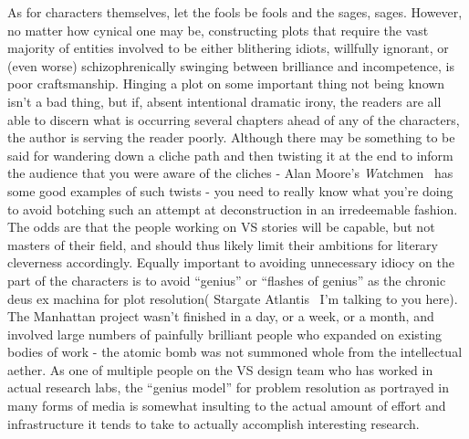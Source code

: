 As for characters themselves, let the fools be fools and the sages,
sages. However, no matter how cynical one may be, constructing plots
that require the vast majority of entities involved to be either
blithering idiots, willfully ignorant, or (even worse)
schizophrenically swinging between brilliance and incompetence, is
poor craftsmanship. Hinging a plot on some important thing not being
known isn't a bad thing, but if, absent intentional dramatic irony,
the readers are all able to discern what is occurring several chapters
ahead of any of the characters, the author is serving the reader
poorly. Although there may be something to be said for wandering down
a cliche path and then twisting it at the end to inform the audience
that you were aware of the cliches - Alan Moore's {\emph
Watchmen}~\cite{Moore-Watchmen} has some good examples of such twists - 
you need to really know what you're doing to avoid botching such an
attempt at deconstruction in an irredeemable fashion. The odds are that
the people working on VS stories will be capable, but not masters of
their field, and should thus likely limit their ambitions for literary
cleverness accordingly. Equally important to avoiding unnecessary
idiocy on the part of the characters is to avoid ``genius'' or
``flashes of genius'' as the chronic deus ex machina for plot
resolution( Stargate Atlantis~\cite{StargateAtlantis} I'm talking to
you here). The Manhattan project wasn't finished in a day, or a week,
or a month, and involved large numbers of painfully brilliant people
who expanded on existing bodies of work - the atomic bomb was not
summoned whole from the intellectual aether. As one of multiple people
on the VS design team who has worked in actual research labs, the
``genius model'' for problem resolution as portrayed in many forms of
media is somewhat insulting to the actual amount of effort and
infrastructure it tends to take to actually accomplish interesting
research. 

